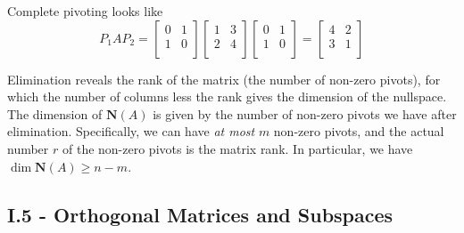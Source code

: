 \documentclass[a4paper]{article}
\begin{document}
Complete pivoting looks like
\[
	P_{1}AP_{2} =
	\begin{bmatrix}
		0 & 1 \\
		1 & 0 \\
	\end{bmatrix}
	\begin{bmatrix}
		1 & 3 \\
		2 & 4 \\
	\end{bmatrix}
	\begin{bmatrix}
		0 & 1 \\
		1 & 0 \\
	\end{bmatrix}
	=
	\begin{bmatrix}
		4 & 2 \\
		3 & 1 \\
	\end{bmatrix}
\]


Elimination reveals the rank of the matrix (the number of non-zero pivots), for which the number of columns less the rank gives the dimension of the nullspace. The dimension of \(\textbf{N}\!\left( A \right) \) is given by the number of non-zero pivots we have after elimination. Specifically, we can have \textit{at most} \(m\) non-zero pivots, and the actual number \(r\) of the non-zero pivots is the matrix rank. In particular, we have \(\dim \textbf{N}\!\left( A \right) \ge n - m\).

\newpage
\subsection{\textsf{I.5 - Orthogonal Matrices and Subspaces}}

\end{document}
